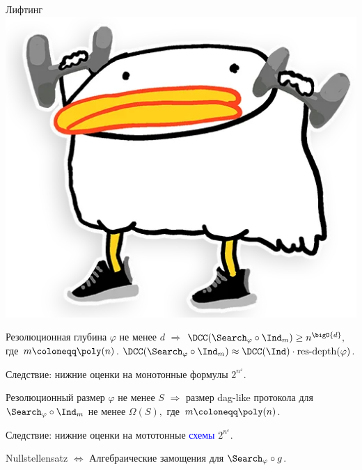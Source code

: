 \begin{frame}{Лифтинг \includegraphics[scale = 0.04]{pics/utia-lift.png}}

    \begin{theorem}
        Резолюционная глубина $\varphi$ не менее $d$ $\Rightarrow$
        $\DCC(\Search_{\varphi} \circ \Ind_m) \ge n^{\bigO{d}},$
        где $m \coloneqq \poly(n)$. \alert{$\DCC(\Search_{\varphi} \circ \Ind_m) \approx
            \DCC(\Ind) \cdot \mathrm{res\text{-}depth}(\varphi)$.}
    \end{theorem}

    Следствие: нижние оценки на монотонные формулы $2^{n^{\varepsilon}}$.
    \pause

    \begin{theorem}
        Резолюционный размер $\varphi$ не менее $S$ $\Rightarrow$
        размер \alert{dag-like} протокола для $\Search_{\varphi} \circ \Ind_m$ не менее $\Omega(S),$
        где $m \coloneqq \poly(n)$.
    \end{theorem}

    Следствие: нижние оценки на мототонные \textcolor{blue}{схемы} $2^{n^{\varepsilon}}$.
    \pause

    \begin{theorem}
        Nullstellensatz $\Leftrightarrow$ \alert{Алгебраические замощения} для $\Search_{\varphi} \circ
        g$.
    \end{theorem}

\end{frame}

